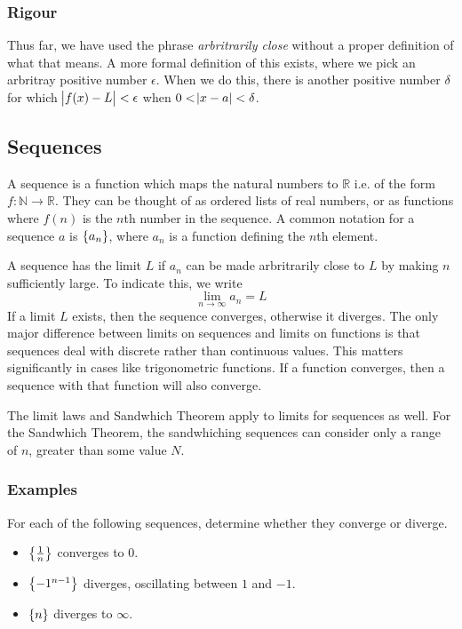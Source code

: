 \documentclass[12pt]{report}
\newcommand{\N}{\mathbb{N}}
\newcommand{\R}{\mathbb{R}}
\newcommand{\limit}{\lim\limits}
\begin{document}
\begin{flushleft}
\subsubsection*{Rigour}
Thus far, we have used the phrase \textit{arbritrarily close} without a proper
definition of what that means. A more formal definition of this exists, where
we pick an arbritray positive number \(\epsilon\). When we do this, there is
another positive number \(\delta\) for which \(\abs{f(x) - L} < \epsilon\) when
\(0 < \abs{x - a} < \delta\).

\subsection*{Sequences}
A sequence is a function which maps the natural numbers to \(\R\) i.e. of the
form \(f: \N \rightarrow \R\). They can be thought of as ordered lists of real
numbers, or as functions where \(f(n)\) is the \(n\)th number in the sequence.
A common notation for a sequence \(a\) is \(\set{a_n}\), where \(a_n\) is a 
function defining the \(n\)th element. \par
A sequence has the limit \(L\) if \(a_n\) can be made arbritrarily close to 
\(L\) by making \(n\) sufficiently large. To indicate this, we write
\[\limit_{n\rightarrow\infty} a_n = L\]
If a limit \(L\) exists, then the sequence converges, otherwise it diverges.
The only major difference between limits on sequences and limits on functions
is that sequences deal with discrete rather than continuous values. This 
matters significantly in cases like trigonometric functions. If a function
converges, then a sequence with that function will also converge. \par
The limit laws and Sandwhich Theorem apply to limits for sequences as well.
For the Sandwhich Theorem, the sandwhiching sequences can consider only a range
of \(n\), greater than some value \(N\).

\subsubsection*{Examples}
For each of the following sequences, determine whether they converge or 
diverge.
\begin{itemize}
    \item \(\set{\frac{1}{n}}\) converges to \(0\).
    \item \(\set{-1^{n - 1}}\) diverges, oscillating between \(1\) and \(-1\).
    \item \(\set{n}\) diverges to \(\infty\).
\end{itemize}


\end{flushleft}
\end{document}
